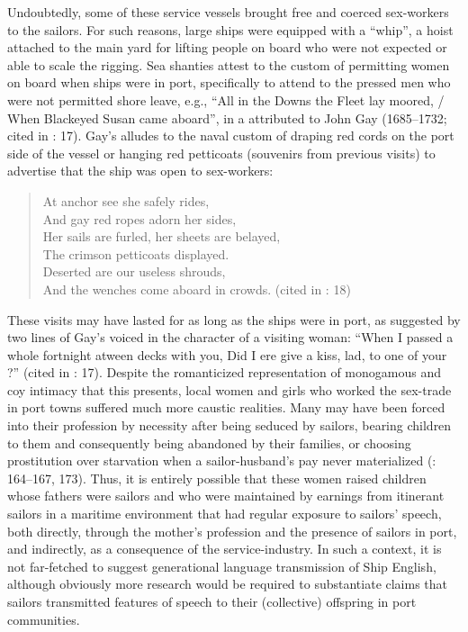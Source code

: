 Undoubtedly, some of these service vessels brought free and coerced sex-work\-ers to the sailors. For such reasons, large ships were equipped with a “whip”, a hoist attached to the main yard for lifting people on board who were not expected or able to scale the rigging. Sea shanties attest to the custom of permitting women on board when ships were in port, specifically to attend to the pressed men who were not permitted shore leave, e.g.,  “All in the Downs the Fleet lay moored, / When Blackeyed Susan came aboard”, in a  attributed to John Gay (1685–1732; cited in \citealt{Hugill1969}: 17). Gay's  alludes to the naval custom of draping red cords on the port side of the vessel or hanging red petticoats (souvenirs from previous visits) to advertise that the ship was open to sex-workers: 

\begin{quotation}
At anchor see she safely rides, \\
And gay red ropes adorn her sides, \\
Her sails are furled, her sheets are belayed, \\
The crimson petticoats displayed. \\
Deserted are our useless shrouds, \\
And the wenches come aboard in crowds. (cited in \citealt{Hugill1969}: 18)
\end{quotation}

These visits may have lasted for as long as the ships were in port, as suggested by two lines of Gay's  voiced in the character of a visiting woman: “When I passed a whole fortnight atween decks with you, Did I ere give a kiss, lad, to one of your ?” (cited in \citealt{Hugill1969}: 17). Despite the romanticized representation of monogamous and coy intimacy that this  presents, local women and girls who worked the sex-trade in port towns suffered much more caustic realities. Many may have been forced into their profession by necessity after being seduced by sailors, bearing children to them and consequently being abandoned by their families, or choosing prostitution over starvation when a sailor-husband’s pay never materialized (\citealt{AdkinsAdkins2008}: 164–167, 173). Thus, it is entirely possible that these women raised children whose fathers were sailors and who were maintained by earnings from itinerant sailors in a maritime environment that had regular exposure to sailors’ speech, both directly, through the mother’s profession and the presence of sailors in port, and indirectly, as a consequence of the service-industry. In such a context, it is not far-fetched to suggest generational language transmission of Ship English, although obviously more research would be required to substantiate claims that sailors transmitted features of speech to their (collective) offspring in port communities. 

